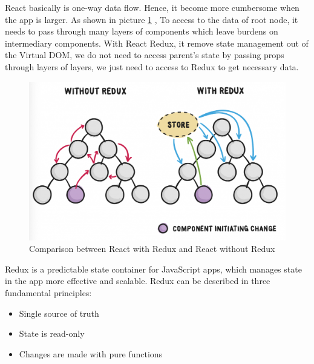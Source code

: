 React basically is one-way data flow. Hence, it become more cumbersome when the app is larger. As shown in picture \ref{fig:React-compare-redux}
, To access to the data of root node, it needs to pass through many layers of components which leave burdens on intermediary components. With React Redux,
it remove state management out of the Virtual DOM, we do not need to access parent's state by passing props through layers of layers, we just need to access to Redux to get 
necessary data.\\

\begin{figure}[!h]
    \centering
    \includegraphics[scale=0.3]{Picture/mobile/RN-compare-redux.png}
    \caption{Comparison between React with Redux and React without Redux}
\label{fig:React-compare-redux}
\end{figure}

Redux is a predictable state container for JavaScript apps, which manages state in the app more effective and scalable. 
Redux can be described in three fundamental principles: \\
\begin{itemize}
    \item Single source of truth
    \item State is read-only
    \item Changes are made with pure functions
\end{itemize}

